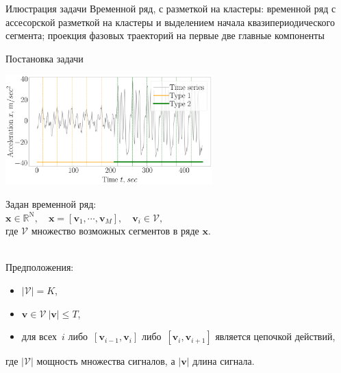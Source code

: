 \documentclass[10pt,pdf,hyperref={unicode}]{beamer}
\begin{document}
\begin{frame}[shrink=5]{Илюстрация задачи}
Временной ряд, с разметкой на кластеры: временной ряд с ассесорской разметкой на кластеры и выделением начала квазипериодического сегмента; проекция фазовых траекторий на первые две главные компоненты

\end{frame}

\begin{frame}[shrink=5]{Постановка задачи}

\begin{center}
	\includegraphics[width=0.6\textwidth]{results/example_slides}
\end{center}

 Задан временной ряд:\\
        $\textbf{x} \in \mathbb{R}^{\text{N}}, \quad \textbf{x} = [\textbf{v}_1, \cdots, \textbf{v}_M], \quad \textbf{v}_i \in \mathcal{V},$\\
        где $\mathcal{V}$ множество возможных сегментов в ряде $\textbf{x}$.

~\\
Предположения:
\begin{itemize}
	\item $\left|\mathcal{V}\right| = K$,
	\item $\textbf{v} \in \mathcal{V}~\left|\textbf{v}\right| \leq T$,
	\item для всех~$i$ либо~$[\textbf{v}_{i-1},\textbf{v}_{i}]$ либо~$[\textbf{v}_{i},\textbf{v}_{i+1}]$  является цепочкой действий,
\end{itemize}
где $\left|\mathcal{V}\right|$ мощность множества сигналов, а $\left|\textbf{v}\right|$ длина сигнала.

\end{frame}
\end{document}
